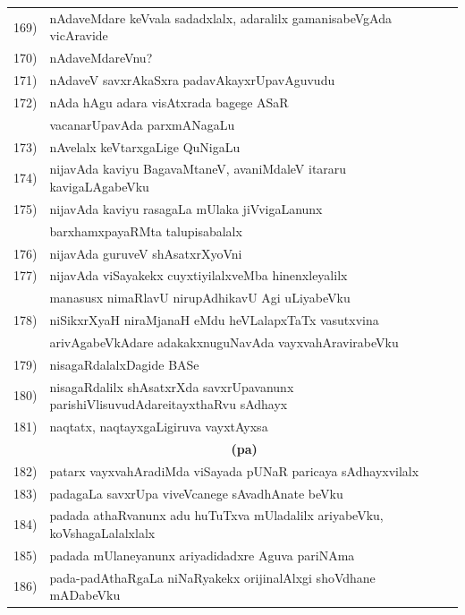 {\begin{longtable}{@{}cp{7.4cm}r}
169) & nAdaveMdare keVvala sadadxlalx, adaralilx gamanisabeVgAda vicAravide & \pageref{page169}\\
170) & nAdaveMdareVnu? & \pageref{page142}\\
171) & nAdaveV savxrAkaSxra padavAkayxrUpavAguvudu & \pageref{page141}\\
172) & nAda hAgu adara visAtxrada bagege ASaR & \\
     & vacanarUpavAda parxmANagaLu & \pageref{page144}\\
173) & nAvelalx keVtarxgaLige QuNigaLu & \pageref{page104}\\
174) & nijavAda kaviyu BagavaMtaneV, avaniMdaleV itararu kavigaLAgabeVku & \pageref{page239}\\
175) & nijavAda kaviyu rasagaLa mUlaka jiVvigaLanunx  & \pageref{page183}\\
     & barxhamxpayaRMta talupisabalalx & \pageref{page183}\\
176) & nijavAda guruveV shAsatxrXyoVni & \pageref{page68}\\
177) & nijavAda viSayakekx cuyxtiyilalxveMba hinenxleyalilx & \\
     & manasusx nimaRlavU nirupAdhikavU Agi uLiyabeVku & \pageref{page250}\\
178) & niSikxrXyaH niraMjanaH eMdu heVLalapxTaTx vasutxvina & \\
     & arivAgabeVkAdare adakakxnuguNavAda vayxvahAravirabeVku & \pageref{page202}\\
179) & nisagaRdalalxDagide BASe & \pageref{page6a}\\
180) & nisagaRdalilx shAsatxrXda savxrUpavanunx parishiVlisuvudAdare\break itayxthaRvu sAdhayx & \pageref{page249}\\
181) & naqtatx, naqtayxgaLigiruva vayxtAyxsa & \pageref{page242}\\[0.3cm]
     &   \multicolumn{1}{c}{\textbf{(pa)}}  & \\[0.3cm]
182) & patarx vayxvahAradiMda viSayada pUNaR paricaya sAdhayxvilalx & \pageref{page30e}\\
183) & padagaLa savxrUpa viveVcanege sAvadhAnate beVku & \pageref{page191}\\
184) & padada athaRvanunx adu huTuTxva mUladalilx ariyabeVku, koVshagaLalalxlalx & \pageref{page202}\\ 
185) & padada mUlaneyanunx ariyadidadxre Aguva pariNAma & \pageref{page186}\\
186) & pada-padAthaRgaLa niNaRyakekx orijinalAlxgi shoVdhane mADabeVku & \pageref{page215}\\

\end{longtable}}
